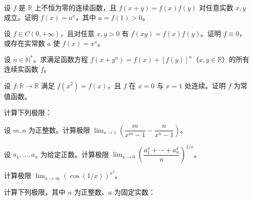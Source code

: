 \noindent\begin{minipage}{\textwidth}
设 $f$ 是 $\mathbb R$ 上不恒为零的连续函数，且 $f(x+y)=f(x)f(y)$ 对任意实数 $x,y$ 成立。证明 $f(x)=a^x$，其中 $a=f(1)>0$。
\end{minipage}\par\vfill
\newpage
\noindent\begin{minipage}{\textwidth}
设 $f\in C(0,+\infty)$，且对任意 $x,y>0$ 有 $f(xy)=f(x)f(y)$。证明 $f\equiv0$，或存在实常数 $a$ 使 $f(x)=x^a$。
\end{minipage}\par\vfill
\noindent\begin{minipage}{\textwidth}
设 $n\in\mathbb N^*$。求满足函数方程 $f(x+y^n)=f(x)+[f(y)]^n$（$x,y\in\mathbb R$）的所有连续实函数 $f$。
\end{minipage}\par\vfill
\noindent\begin{minipage}{\textwidth}
设 $f:\mathbb R\to\mathbb R$ 满足 $f(x^2)=f(x)$，且 $f$ 在 $x=0$ 与 $x=1$ 处连续。证明 $f$ 为常值函数。
\end{minipage}\par\vfill
\newpage
\noindent\begin{minipage}{\textwidth}
计算下列极限：
\end{minipage}\par\vfill
\noindent\begin{minipage}{\textwidth}
设 $m,n$ 为正整数。计算极限 $\lim_{x\to1}\left(\dfrac m{x^m-1}-\dfrac n{x^n-1}\right)$。
\end{minipage}\par\vfill
\noindent\begin{minipage}{\textwidth}
设 $a_1,\ldots,a_n$ 为给定正数。计算极限 $\lim_{x\to0}\left(\dfrac{a_1^x+\cdots+a_n^x}{n}\right)^{1/x}$。
\end{minipage}\par\vfill
\newpage
\noindent\begin{minipage}{\textwidth}
计算极限 $\lim_{x\to\infty}(\cos(1/x))^{x^2}$。
\end{minipage}\par\vfill
\noindent\begin{minipage}{\textwidth}
计算下列极限，其中 $n$ 为正整数、$a$ 为固定实数：
\end{minipage}\par\vfill
